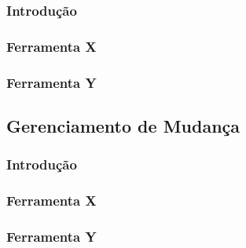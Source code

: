 \documentclass[12pt,a4paper]{article}
\begin{document}
		\subsubsection{Introdução}
		\subsubsection{Ferramenta X}
		\subsubsection{Ferramenta Y}
	
	\subsection{Gerenciamento de Mudança}
		\subsubsection{Introdução}
		\subsubsection{Ferramenta X}
		\subsubsection{Ferramenta Y}
		
		

\clearpage
\nocite{*}
		
		
\end{document}
